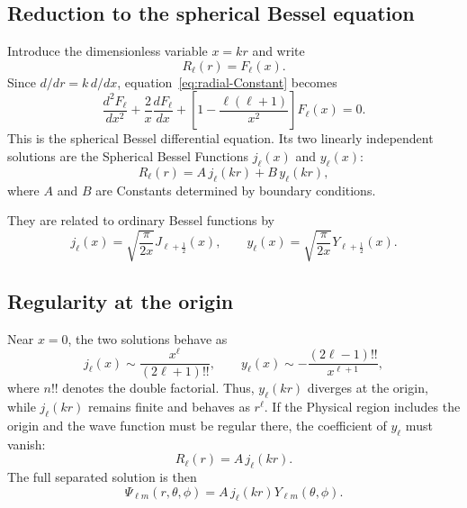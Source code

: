 \documentclass[a4paper, 10pt, onepage]{elegantbook}
\begin{document}
{\subsection{Reduction to the spherical Bessel equation}

Introduce the dimensionless variable $x=kr$ and write
\begin{equation}
  R_\ell(r)=F_\ell(x).
\end{equation}
Since $d/dr=k\,d/dx$, equation~\eqref{eq:radial-Constant} becomes
\begin{equation}
  \frac{d^2F_\ell}{dx^2}
  +\frac{2}{x}\frac{dF_\ell}{dx}
  +\left[1-\frac{\ell(\ell+1)}{x^2}\right]F_\ell(x)=0.
  \label{eq:spherical-bessel}
\end{equation}
This is the spherical Bessel differential equation. Its two
linearly independent solutions are the Spherical Bessel Functions
$j_\ell(x)$ and $y_\ell(x)$:
\begin{equation}
  R_\ell(r)=A\,j_\ell(kr)+B\,y_\ell(kr),
  \label{eq:general-solution}
\end{equation}
where $A$ and $B$ are Constants determined by boundary conditions.

They are related to ordinary Bessel functions by
\begin{equation}
  j_\ell(x)=\sqrt{\frac{\pi}{2x}}J_{\ell+\frac12}(x),
  \qquad
  y_\ell(x)=\sqrt{\frac{\pi}{2x}}Y_{\ell+\frac12}(x).
\end{equation}

\subsection{Regularity at the origin}

\noindent

Near $x=0$, the two solutions behave as
\begin{equation}
  j_\ell(x)\sim \frac{x^\ell}{(2\ell+1)!!},
  \qquad
  y_\ell(x)\sim -\frac{(2\ell-1)!!}{x^{\ell+1}},
\end{equation}
where $n!!$ denotes the double factorial. Thus, $y_\ell(kr)$ diverges
at the origin, while $j_\ell(kr)$ remains finite and behaves as
$r^\ell$. If the Physical region includes the origin and the wave
function must be regular there, the coefficient of $y_\ell$ must
vanish:
\begin{equation}
  R_\ell(r)=A\,j_\ell(kr).
\end{equation}
The full separated solution is then
\begin{equation}
  \Psi_{\ell m}(r,\theta,\phi)
  =A\,j_\ell(kr)Y_{\ell m}(\theta,\phi).
\end{equation}

}
\end{document}

